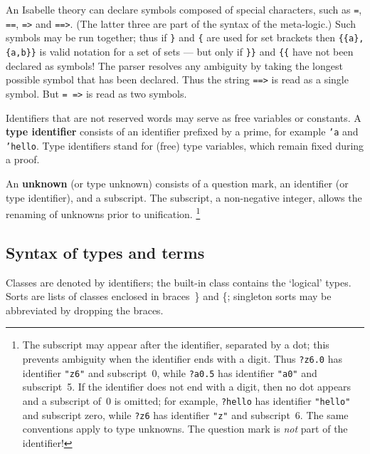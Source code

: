 An Isabelle theory can declare symbols composed of special characters, such
as {\tt=}, {\tt==}, {\tt=>} and {\tt==>}.  (The latter three are part of
the syntax of the meta-logic.)  Such symbols may be run together; thus if
\verb|}| and \verb|{| are used for set brackets then \verb|{{a},{a,b}}| is
valid notation for a set of sets --- but only if \verb|}}| and \verb|{{|
have not been declared as symbols!  The parser resolves any ambiguity by
taking the longest possible symbol that has been declared.  Thus the string
{\tt==>} is read as a single symbol.  But \hbox{\tt= =>} is read as two
symbols.

Identifiers that are not reserved words may serve as free variables or
constants.  A {\bf type identifier} consists of an identifier prefixed by a
prime, for example {\tt'a} and \hbox{\tt'hello}.  Type identifiers stand
for (free) type variables, which remain fixed during a proof.

An {\bf unknown} (or type unknown) consists of a question
mark, an identifier (or type identifier), and a subscript.  The subscript,
a non-negative integer,
allows the renaming of unknowns prior to unification.%
\footnote{The subscript may appear after the identifier, separated by a
  dot; this prevents ambiguity when the identifier ends with a digit.  Thus
  {\tt?z6.0} has identifier {\tt"z6"} and subscript~0, while {\tt?a0.5}
  has identifier {\tt"a0"} and subscript~5.  If the identifier does not
  end with a digit, then no dot appears and a subscript of~0 is omitted;
  for example, {\tt?hello} has identifier {\tt"hello"} and subscript
  zero, while {\tt?z6} has identifier {\tt"z"} and subscript~6.  The same
  conventions apply to type unknowns.  The question mark is {\it not\/}
  part of the identifier!}


\subsection{Syntax of types and terms}

Classes are denoted by identifiers; the built-in class 
contains the `logical' types.  Sorts are lists of classes enclosed in
braces~\} and \{; singleton sorts may be abbreviated by dropping the braces.

